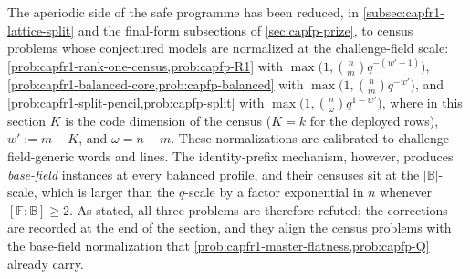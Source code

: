 \documentclass[11pt]{article}
\theoremstyle{definition}
\theoremstyle{remark}
\newcommand{\F}{\mathbb{F}}
\newcommand{\B}{\mathbb{B}}
\begin{document}
The aperiodic side of the safe programme has been reduced, in
\cref{subsec:capfr1-lattice-split} and the final-form subsections of
\cref{sec:capfp-prize}, to census problems whose conjectured models are
normalized at the challenge-field scale:
\cref{prob:capfr1-rank-one-census,prob:capfp-R1} with
$\max\bigl(1,\binom nmq^{-(w'-1)}\bigr)$,
\cref{prob:capfr1-balanced-core,prob:capfp-balanced} with
$\max\bigl(1,\binom nmq^{-w'}\bigr)$, and
\cref{prob:capfr1-split-pencil,prob:capfp-split} with
$\max\bigl(1,\binom n\omega q^{1-w'}\bigr)$, where in this section
$K$ is the code dimension of the census ($K=k$ for the deployed rows),
$w':=m-K$, and $\omega=n-m$.  These normalizations are calibrated to
challenge-field-generic words and lines.  The identity-prefix mechanism,
however, produces \emph{base-field} instances at every balanced profile,
and their censuses sit at the $|\B|$-scale, which is larger than the
$q$-scale by a factor exponential in $n$ whenever $[\F:\B]\ge2$.  As
stated, all three problems are therefore refuted; the corrections are
recorded at the end of the section, and they align the census problems
with the base-field normalization that
\cref{prob:capfr1-master-flatness,prob:capfp-Q} already carry.
\end{document}
